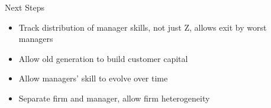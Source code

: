 \documentclass[
  ignorenonframetext,
  aspectratio=1610,
]{beamer}
\providecommand{\tightlist}{%
  \setlength{\itemsep}{0pt}\setlength{\parskip}{0pt}}
\begin{document}
\begin{frame}{Next Steps}
\protect\hypertarget{next-steps}{}
\begin{itemize}
\tightlist
\item
  Track distribution of manager skills, not just Z, allows exit by worst
  managers
\item
  Allow old generation to build customer capital
\item
  Allow managers' skill to evolve over time
\item
  Separate firm and manager, allow firm heterogeneity
\end{itemize}
\end{frame}
\end{document}
